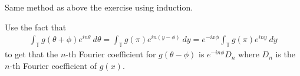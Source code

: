 \begin{exercise}
  Same method as above the exercise using induction.
\end{exercise}

\begin{corollary}
  Use the fact that
  \begin{align*}
    \int_{\mathbb{T}}  g(  \theta+ \phi) e^{ i n \theta} \ d \theta  =
    \int_{\mathbb{T}}  g( \pi) e^{in(y -  \phi)} \ d  y = e^{-ix
    \phi} \int_{\mathbb{T}}  g(\pi) e^{iny} \ d y
  \end{align*}
  to get that the $n$-th Fourier coefficient for $g(\theta - \phi)$
  is $e^{-in\phi} D_n$ where $D_n$ is the $ n$-th Fourier
  coefficient of $g(x)$.
\end{corollary}


